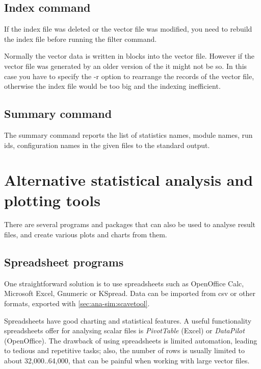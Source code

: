 \subsection{Index command}

If the index file was deleted or the vector file was modified, you need to
rebuild the index file before running the filter command.

Normally the vector data is written in blocks into the vector file.
However if the vector file was generated by an older version of the
 it might not be so. In this case you have
to specify the -r option to rearrange the records of the vector file,
otherwise the index file would be too big and the indexing inefficient.

\subsection{Summary command}

The summary command reports the list of statistics names, module names,
run ids, configuration names in the given files to the standard output.



\section{Alternative statistical analysis and plotting tools}

There are several programs and packages that can also be used to analyse
result files, and create various plots and charts from them.

\subsection{Spreadsheet programs}

One straightforward solution is to use spreadsheets such as OpenOffice
Calc, Microsoft Excel, Gnumeric or KSpread. Data can be imported from csv
or other formats, exported with 
\ref{sec:ana-sim:scavetool}.

Spreadsheets have good charting and statistical features. A useful
functionality spreadsheets offer for analysing scalar files is
\textit{PivotTable} (Excel) or \textit{DataPilot} (OpenOffice). The
drawback of using spreadsheets is limited automation, leading to tedious
and repetitive tasks; also, the number of rows is usually limited to about
32,000..64,000, that can be painful when working with large vector files.


